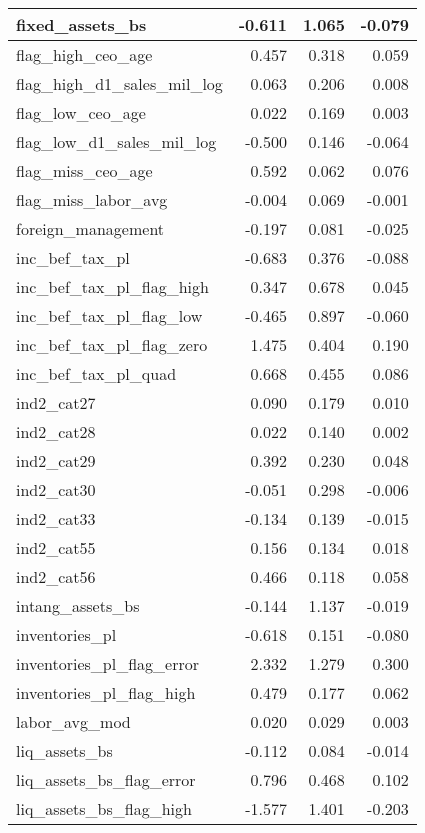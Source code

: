\begin{table}
\begin{tabular}[t]{l|r|r|r}
\hline
fixed\_assets\_bs & -0.611 & 1.065 & -0.079\\
\hline
flag\_high\_ceo\_age & 0.457 & 0.318 & 0.059\\
\hline
flag\_high\_d1\_sales\_mil\_log & 0.063 & 0.206 & 0.008\\
\hline
flag\_low\_ceo\_age & 0.022 & 0.169 & 0.003\\
\hline
flag\_low\_d1\_sales\_mil\_log & -0.500 & 0.146 & -0.064\\
\hline
flag\_miss\_ceo\_age & 0.592 & 0.062 & 0.076\\
\hline
flag\_miss\_labor\_avg & -0.004 & 0.069 & -0.001\\
\hline
foreign\_management & -0.197 & 0.081 & -0.025\\
\hline
inc\_bef\_tax\_pl & -0.683 & 0.376 & -0.088\\
\hline
inc\_bef\_tax\_pl\_flag\_high & 0.347 & 0.678 & 0.045\\
\hline
inc\_bef\_tax\_pl\_flag\_low & -0.465 & 0.897 & -0.060\\
\hline
inc\_bef\_tax\_pl\_flag\_zero & 1.475 & 0.404 & 0.190\\
\hline
inc\_bef\_tax\_pl\_quad & 0.668 & 0.455 & 0.086\\
\hline
ind2\_cat27 & 0.090 & 0.179 & 0.010\\
\hline
ind2\_cat28 & 0.022 & 0.140 & 0.002\\
\hline
ind2\_cat29 & 0.392 & 0.230 & 0.048\\
\hline
ind2\_cat30 & -0.051 & 0.298 & -0.006\\
\hline
ind2\_cat33 & -0.134 & 0.139 & -0.015\\
\hline
ind2\_cat55 & 0.156 & 0.134 & 0.018\\
\hline
ind2\_cat56 & 0.466 & 0.118 & 0.058\\
\hline
intang\_assets\_bs & -0.144 & 1.137 & -0.019\\
\hline
inventories\_pl & -0.618 & 0.151 & -0.080\\
\hline
inventories\_pl\_flag\_error & 2.332 & 1.279 & 0.300\\
\hline
inventories\_pl\_flag\_high & 0.479 & 0.177 & 0.062\\
\hline
labor\_avg\_mod & 0.020 & 0.029 & 0.003\\
\hline
liq\_assets\_bs & -0.112 & 0.084 & -0.014\\
\hline
liq\_assets\_bs\_flag\_error & 0.796 & 0.468 & 0.102\\
\hline
liq\_assets\_bs\_flag\_high & -1.577 & 1.401 & -0.203\\

\end{tabular}
\end{table}
